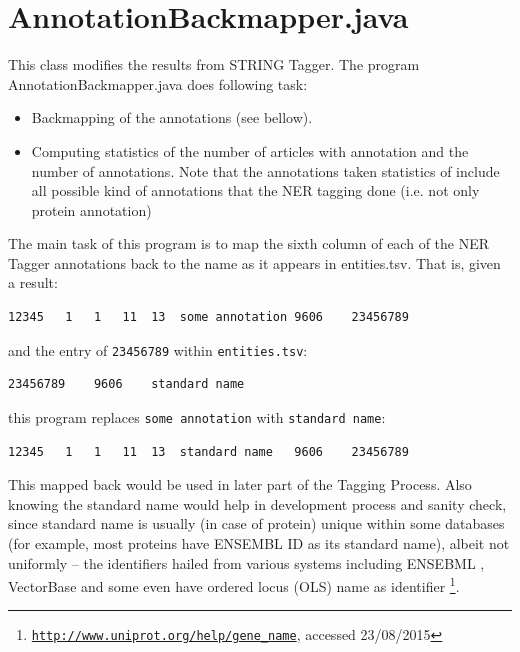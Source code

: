 \section{AnnotationBackmapper.java}

\label{sec:AnnotationBackmapper}

This class modifies the results from STRING Tagger. The program AnnotationBackmapper.java does following task:

\begin{itemize}
\item Backmapping of the annotations (see bellow).
\item Computing statistics of the number of articles with annotation and the number of annotations. Note that the annotations taken statistics of include all possible kind of annotations that the NER tagging done (i.e. not only protein annotation)
\end{itemize}

The main task of this program is to map the sixth column of each of the NER Tagger annotations back to the name as it appears in entities.tsv. That is, given a result:

\begin{verbatim}
12345	1	1	11	13	some annotation	9606	23456789
\end{verbatim}

and the entry of \texttt{23456789} within \texttt{entities.tsv}:

\begin{verbatim}
23456789	9606	standard name
\end{verbatim}

this program replaces \texttt{some annotation} with \texttt{standard name}:

\begin{verbatim}
12345	1	1	11	13	standard name	9606	23456789
\end{verbatim}

This mapped back would be used in later part of the Tagging Process. Also knowing the standard name would help in development process and sanity check, since standard name is usually (in case of protein) unique within some databases (for example, most proteins have ENSEMBL ID as its standard name), albeit not uniformly -- the identifiers hailed from various systems including ENSEBML \citep{hubbard2002ensembl}, VectorBase \citep{lawson2009vectorbase} and some even have ordered locus (OLS) name as identifier \footnote{\href{http://www.uniprot.org/help/gene_name}{\texttt{http://www.uniprot.org/help/gene\_name}}, accessed 23/08/2015}.

